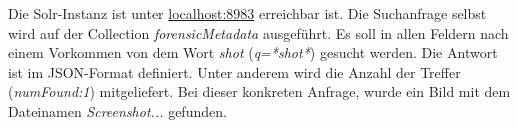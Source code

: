 \noindent
Die Solr-Instanz ist unter \url{localhost:8983} erreichbar ist. Die Suchanfrage selbst wird auf der Collection \textit{forensicMetadata} ausgeführt. Es soll in allen Feldern nach einem Vorkommen von dem Wort \textit{shot} (\textit{q=*shot*}) gesucht werden. Die Antwort ist im JSON-Format definiert. Unter anderem wird die Anzahl der Treffer (\textit{numFound:1}) mitgeliefert. Bei dieser konkreten Anfrage, wurde ein Bild mit dem Dateinamen \textit{Screenshot...} gefunden. 